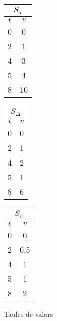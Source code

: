   \begin{subfigure}{\textwidth}
    \centering
  \begin{tabular}[c]{|c|c|}
    \multicolumn{2}{c}{$S_a$} \\ \hline
    $t$  & $v$ \\ \hline
    0   & 0 \\
    2   & 1 \\
    4   & 3 \\
    5   & 4 \\
    8   & 10 \\ \hline
  \end{tabular} \qquad
  \begin{tabular}[c]{|c|c|}
    \multicolumn{2}{c}{$S_\Delta$} \\ \hline
    $t$  & $v$ \\ \hline
    0   & 0 \\
    2 & 1 \\
    4 & 2 \\
    5 & 1 \\
    8 & 6 \\ \hline
  \end{tabular} \qquad
  \begin{tabular}[c]{|c|c|}
    \multicolumn{2}{c}{$S_v$} \\ \hline
    $t$  & $v$ \\ \hline
    0   & 0 \\
    2 & 0{,}5 \\
    4 & 1 \\
    5 & 1 \\
    8 & 2 \\ \hline
  \end{tabular}
  \caption{Taules de valors}
  \end{subfigure}

